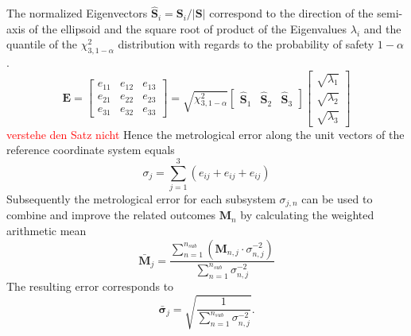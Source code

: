 \documentclass[5p,times,procedia]{elsarticle}
\begin{document}
%
The normalized Eigenvectors $\mathbf{\hat{S}}_i = \mathbf{S}_i / |\mathbf{S}|$ correspond to the direction of the semi-axis of the ellipsoid and the square root of product of the Eigenvalues $\lambda_i$ and the quantile of the $\chi^2_{3,1-\alpha} $ distribution with regards to the probability of safety $1-\alpha$ \cite{Pelzer1995}.
%
\begin{equation}
	\mathbf{E} =
	\begin{bmatrix}
		e_{11}^{} & e_{12}^{} & e_{13}^{} \\
		e_{21}^{} & e_{22}^{} & e_{23}^{} \\
		e_{31}^{} & e_{32}^{} & e_{33}^{}
	\end{bmatrix}
	=
	\sqrt{ \chi^2_{3,1-\alpha}}
	\begin{bmatrix}
		\mathbf{\hat{S}}_1^{} & \mathbf{\hat{S}}_2^{} & \mathbf{\hat{S}}_3^{}
	\end{bmatrix}
	\begin{bmatrix}
		\sqrt{\lambda_1^{}} \\
		\sqrt{\lambda_2^{}} \\
		\sqrt{\lambda_3^{}}
	\end{bmatrix}
\end{equation}
\textcolor{red}{verstehe den Satz nicht}
Hence the metrological error along the unit vectors of the reference coordinate system equals
\begin{equation}
	\sigma_j = \sum_{j=1}^{3} \left( e_{ij} + e_{ij} + e_{ij}\right)
\end{equation}
%
Subsequently the metrological error for each subsystem $\sigma_{j,n}$ can be used to combine and improve the related outcomes $\mathbf{M}_n$ by calculating the weighted arithmetic mean \cite{Price1972}
\begin{equation}
	\mathbf{\bar{M}}_{j} = \frac{\sum_{n=1}^{n_{sub}} \left( \mathbf{M}_{n,j} \cdot \sigma_{n,j}^{-2} \right)}{\sum_{n=1}^{n_{sub}} \sigma_{n,j}^{-2}}
\end{equation}
The resulting error corresponds to
\begin{equation}
	\mathbf{\bar{\sigma}}_{j} = \sqrt{ \frac{1}{\sum_{n=1}^{n_{sub}} \sigma_{n,j}^{-2}} }.
	\label{eqn:sum_noise}
\end{equation}
%
%
\end{document}
